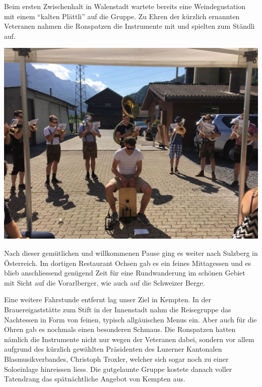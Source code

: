\begin{history}
    Beim ersten Zwischenhalt in Walenstadt wartete bereits eine
    Weindegustation mit einem \enquote{kalten Plättli} auf die Gruppe. Zu
    Ehren der kürzlich ernannten Veteranen nahmen die Ronspatzen die
    Instrumente mit und spielten zum Ständli auf.

    \begin{MulticolFigure}
        \centering
        \includegraphics[width=0.93\linewidth]{./chap/2001-2024/2017/Ronspatzen.jpg}
    \end{MulticolFigure}

    Nach dieser gemütlichen und willkommenen Pause ging es weiter nach
    Sulzberg in Österreich. Im dortigen Restaurant Ochsen gab es ein
    feines Mittagessen und es blieb anschliessend genügend Zeit für
    eine Rundwanderung im schönen Gebiet mit Sicht auf die
    Vorarlberger, wie auch auf die Schweizer Berge.

    Eine weitere Fahrstunde entfernt lag unser Ziel in Kempten. In der
    Brauereigaststätte zum Stift in der Innenstadt nahm die
    Reisegruppe das Nachtessen in Form von feinen, typisch
    allgäuischen Menus ein. Aber auch für die Ohren gab es nochmals
    einen besonderen Schmaus. Die Ronspatzen hatten nämlich die
    Instrumente nicht nur wegen der Veteranen dabei, sondern vor allem
    aufgrund des kürzlich gewählten Präsidenten des Luzerner
    Kantonalen Blasmusikverbandes, Christoph Troxler, welcher sich
    sogar noch zu einer Soloeinlage hinreissen liess. Die gutgelaunte
    Gruppe kostete danach voller Tatendrang das spätnächtliche Angebot
    von Kempten aus.


\end{history}
